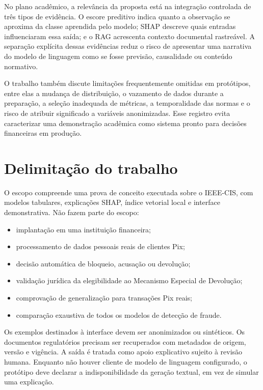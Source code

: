 No plano acadêmico, a relevância da proposta está na integração controlada de três tipos de evidência. O escore preditivo indica quanto a observação se aproxima da classe aprendida pelo modelo; SHAP descreve quais entradas influenciaram essa saída; e o RAG acrescenta contexto documental rastreável. A separação explícita dessas evidências reduz o risco de apresentar uma narrativa do modelo de linguagem como se fosse previsão, causalidade ou conteúdo normativo.

O trabalho também discute limitações frequentemente omitidas em protótipos, entre elas a mudança de distribuição, o vazamento de dados durante a preparação, a seleção inadequada de métricas, a temporalidade das normas e o risco de atribuir significado a variáveis anonimizadas. Esse registro evita caracterizar uma demonstração acadêmica como sistema pronto para decisões financeiras em produção.

\section{Delimitação do trabalho}

O escopo compreende uma prova de conceito executada sobre o IEEE-CIS, com modelos tabulares, explicações SHAP, índice vetorial local e interface demonstrativa. Não fazem parte do escopo:

\begin{itemize}
  \item implantação em uma instituição financeira;
  \item processamento de dados pessoais reais de clientes Pix;
  \item decisão automática de bloqueio, acusação ou devolução;
  \item validação jurídica da elegibilidade ao Mecanismo Especial de Devolução;
  \item comprovação de generalização para transações Pix reais;
  \item comparação exaustiva de todos os modelos de detecção de fraude.
\end{itemize}

Os exemplos destinados à interface devem ser anonimizados ou sintéticos. Os documentos regulatórios precisam ser recuperados com metadados de origem, versão e vigência. A saída é tratada como apoio explicativo sujeito à revisão humana. Enquanto não houver cliente de modelo de linguagem configurado, o protótipo deve declarar a indisponibilidade da geração textual, em vez de simular uma explicação.

